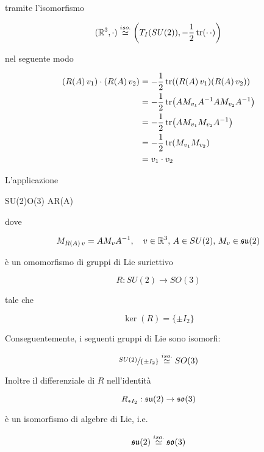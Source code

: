 tramite l'isomorfismo

\begin{equation}
	(\mathbb{R}^{3},\cdot) \stackrel{iso.}{\simeq} \left( T_{I}(SU(2)), -\dfrac{1}{2} \tr(\cdot \, \cdot) \right)
\end{equation}

nel seguente modo

\begin{align}
	\begin{split}
		(R(A) \, v_{1}) \cdot (R(A) \, v_{2}) &= - \dfrac{1}{2} \tr( (R(A) \, v_{1}) (R(A) \, v_{2}) ) \\
		&= - \dfrac{1}{2} \tr( A M_{v_{1}} A^{-1} A M_{v_{2}} A^{-1} ) \\
		&= - \dfrac{1}{2} \tr( A M_{v_{1}} M_{v_{2}} A^{-1} ) \\
		&= - \dfrac{1}{2} \tr( M_{v_{1}} M_{v_{2}} ) \\
		&= v_{1} \cdot v_{2}
	\end{split}
\end{align}

\begin{theorem}
	L'applicazione
	
		{SU(2)}{O(3)}
		{A}{R(A)}
	
	dove
	
	\begin{equation}
		 M_{R(A) \, v} = A M_{v} A^{-1} %
		 \qcomma v \in \R^{3}, \, A \in SU(2), \, M_{v} \in \su(2)
	\end{equation}

	è un omomorfismo di gruppi di Lie suriettivo
	
	\begin{equation}
		R : SU(2) \to SO(3)
	\end{equation}

	tale che
	
	\begin{equation}
		\ker(R) = \{ \pm I_{2} \}
	\end{equation}

	Conseguentemente, i seguenti gruppi di Lie sono isomorfi:
	
	\begin{equation}
		\sfrac{SU(2)}{\{ \pm I_{2}\}} \stackrel{iso.}{\simeq} SO(3)
	\end{equation}

	Inoltre il differenziale di $ R $ nell'identità 
	
	\begin{equation}
		R_{*I_{2}} : \mathfrak{su}(2) \to \mathfrak{so}(3)
	\end{equation}

	è un isomorfismo di algebre di Lie, i.e.
	
	\begin{equation}
		\mathfrak{su}(2) \stackrel{iso.}{\simeq} \mathfrak{so}(3)
	\end{equation}
\end{theorem}

